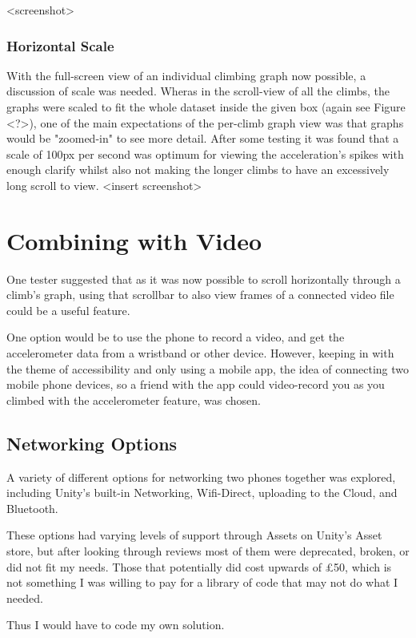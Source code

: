 <screenshot>



\subsubsection{Horizontal Scale}
With the full-screen view of an individual climbing graph now possible, a discussion of scale was needed. 
Wheras in the scroll-view of all the climbs, the graphs were scaled to fit the whole dataset inside the given box (again see Figure <?>), one of the main expectations of the per-climb graph view was that graphs would be "zoomed-in" to see more detail.
After some testing it was found that a scale of 100px per second was optimum for viewing the acceleration's spikes with enough clarify whilst also not making the longer climbs to have an excessively long scroll to view. 
<insert screenshot>


\section{Combining with Video}
One tester suggested that as it was now possible to scroll horizontally through a climb's graph, using that scrollbar to also view frames of a connected video file could be a useful feature.

One option would be to use the phone to record a video, and get the accelerometer data from a wristband or other device.
However, keeping in with the theme of accessibility and only using a mobile app, the idea of connecting two mobile phone devices, so a friend with the app could video-record you as you climbed with the accelerometer feature, was chosen.




\subsection{Networking Options}
A variety of different options for networking two phones together was explored, including Unity's built-in Networking, Wifi-Direct, uploading to the Cloud, and Bluetooth.


These options had varying levels of support through Assets on Unity's Asset store, but after looking through reviews most of them were deprecated, broken, or did not fit my needs.
Those that potentially did cost upwards of £50, which is not something I was willing to pay for a library of code that may not do what I needed.

Thus I would have to code my own solution.


